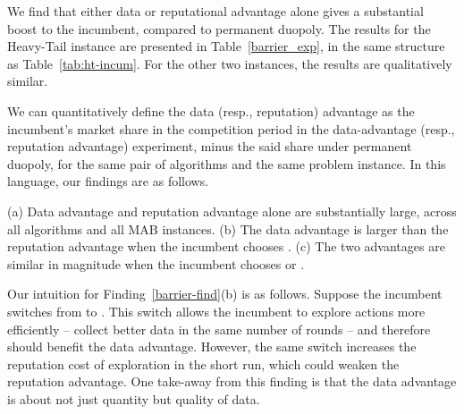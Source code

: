 \documentclass[../competing_bandits.tex]{subfiles}
\begin{document}
We find that either data or reputational advantage alone gives a substantial boost to the incumbent, compared to permanent duopoly. The results for the Heavy-Tail instance are presented in Table~\ref{barrier_exp}, in the same structure as Table~\ref{tab:ht-incum}. For the other two instances, the results are qualitatively similar.

We can quantitatively define the data (resp., reputation) advantage as the incumbent's market share in the competition period in the data-advantage (resp., reputation advantage) experiment, minus the said share under permanent duopoly, for the same pair of algorithms and the same problem instance. In this language, our findings are as follows.


\begin{finding}\label{barrier-find}
(a) Data advantage and reputation advantage alone are substantially large, across all algorithms and all MAB instances. (b) The data advantage is larger than the reputation advantage when the incumbent chooses \TS. (c) The two advantages are similar in magnitude when the incumbent chooses \DEG or \DG.
\end{finding}



Our intuition for Finding~\ref{barrier-find}(b) is as follows. Suppose the incumbent switches from \DG to \TS. This switch allows the incumbent to explore actions more efficiently -- collect better data in the same number of rounds -- and therefore should benefit the data advantage. However, the same switch increases the reputation cost of exploration in the short run, which could weaken the reputation advantage. One take-away from this finding is that the data advantage is about not just quantity but quality of data.
\end{document}

